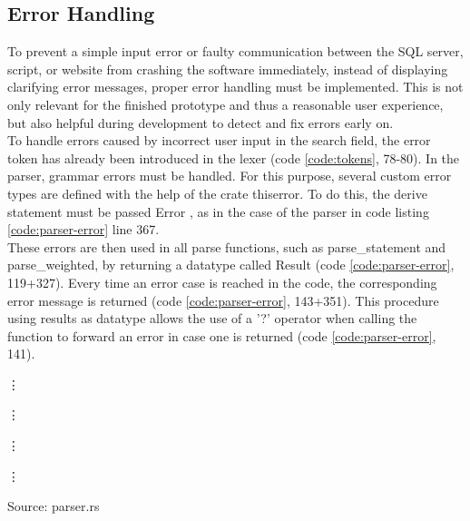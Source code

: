 \subsection{Error Handling}
To prevent a simple input error or faulty communication between the \ac{SQL} server, script, or website from crashing the software immediately, instead of displaying clarifying error messages, proper error handling must be implemented. This is not only relevant for the finished prototype and thus a reasonable user experience, but also helpful during development to detect and fix errors early on.\\
To handle errors caused by incorrect user input in the search field, the error token has already been introduced in the lexer (code \ref{code:tokens}, 78-80). In the parser, grammar errors must be handled. For this purpose, several custom error types are defined with the help of the crate thiserror. To do this, the derive statement must be passed Error \parencite[cf.][n.p.]{tolnay_thiserror_2019}, as in the case of the parser in code listing \ref{code:parser-error} line 367.\\
These errors are then used in all parse functions, such as parse\_statement and parse\_weighted, by returning a datatype called Result (code \ref{code:parser-error}, 119+327). Every time an error case is reached in the code, the corresponding error message is returned (code \ref{code:parser-error}, 143+351). This procedure using results as datatype allows the use of a '?' operator when calling the function to forward an error in case one is returned (code \ref{code:parser-error}, 141).
\begin{codeenv}
    \label{code:parser-error}
    
    \vdots
    
    \vdots
    
    \vdots
    
    \vdots
    
    \centerline{Source: parser.rs}
\end{codeenv}